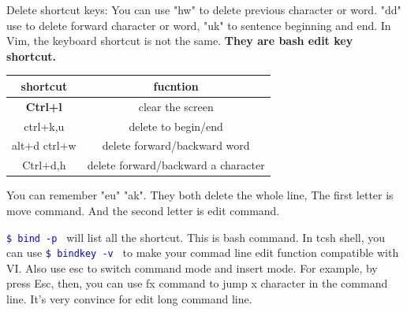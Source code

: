 \documentclass[paper=8.5in:11in, twoside, 12pt, pagesize=pdftex]{book}
\newcommand{\linuxcommand}[1]{\texttt{\textcolor{blue}{\$ #1 \Pisymbol{psy}{191}}}}
\begin{document}
\par Delete shortcut keys: You can use "hw" to delete previous character or word. "dd" use to delete forward character or word, "uk" to sentence beginning and end. In Vim, the keyboard shortcut is not the same. \textbf{They are bash edit key shortcut.}

\begin{center}
  \begin{tabular}{|c|c|}
 \hline shortcut & fucntion \\
 \hline \textbf{Ctrl+l} & clear the screen \\	
\hline ctrl+k,u & delete to begin/end \\
\hline alt+d ctrl+w & delete forward/backward word \\
\hline Ctrl+d,h  & delete forward/backward a character  \\
 \hline
  \end{tabular}
\end{center}

	You can remember "eu" "ak". They both delete the whole line, The first letter is move command. And the second letter is edit command. 

	\linuxcommand{bind -p} will list all the shortcut. This is bash command. In tcsh shell, you can use \linuxcommand{bindkey -v} to make your commad line edit function compatible with VI. Also use esc to switch command mode and insert mode. For example, by press Esc, then, you can use fx command to jump x character in the command line. It's very convince for edit long command line.
	

\ifdefined\autotools
\end{document}
